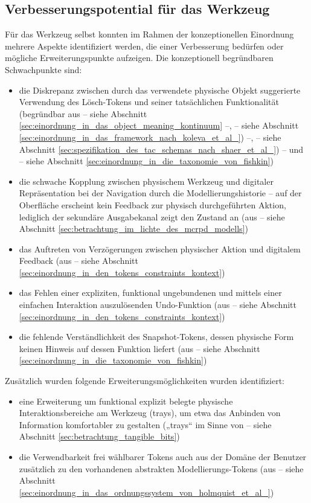 
\subsection{Verbesserungspotential für das Werkzeug} %
\label{sub:verbesserungspotential_für_das_werkzeug}

Für das Werkzeug selbst konnten im Rahmen der konzeptionellen Einordnung mehrere Aspekte identifiziert werden, die einer Verbesserung bedürfen oder mögliche Erweiterungspunkte aufzeigen. Die konzeptionell begründbaren Schwachpunkte sind:
\begin{itemize}
	\item die Diskrepanz zwischen durch das verwendete physische Objekt suggerierte Verwendung des Lösch-Tokens und seiner tatsächlichen Funktionalität (begründbar aus \citep{Underkoffler99} -- siehe Abschnitt \ref{sec:einordnung_in_das_object_meaning_kontinuum} --, \citep{Koleva03} -- siehe Abschnitt \ref{sec:einordnung_in_das_framework_nach_koleva_et_al_}) --, \citep{Shaer04} -- siehe Abschnitt \ref{sec:spezifikation_des_tac_schemas_nach_shaer_et_al_}) -- und \citep{Fishkin04} -- siehe Abschnitt \ref{sec:einordnung_in_die_taxonomie_von_fishkin})
	\item die schwache Kopplung zwischen physischem Werkzeug und digitaler Repräsentation bei der Navigation durch die Modellierungshistorie -- auf der Oberfläche erscheint kein Feedback zur physisch durchgeführten Aktion, lediglich der sekundäre Ausgabekanal zeigt den Zustand an (aus \citep{Ullmer00} -- siehe Abschnitt \ref{sec:betrachtung_im_lichte_des_mcrpd_modells})
	\item das Auftreten von Verzögerungen zwischen physischer Aktion und digitalem Feedback (aus \citep{Bellotti02} -- siehe Abschnitt \ref{sec:einordnung_in_den_tokens_constraints_kontext})
	\item das Fehlen einer expliziten, funktional ungebundenen und mittels einer einfachen Interaktion auszulösenden Undo-Funktion (aus \citep{Bellotti02} -- siehe Abschnitt \ref{sec:einordnung_in_den_tokens_constraints_kontext})
	\item die fehlende Verständlichkeit des Snapshot-Tokens, dessen physische Form keinen Hinweis auf dessen Funktion liefert (aus \citep{Fishkin04} -- siehe Abschnitt \ref{sec:einordnung_in_die_taxonomie_von_fishkin})
\end{itemize}

Zusätzlich wurden folgende Erweiterungsmöglichkeiten wurden identifiziert:
\begin{itemize}
	\item eine Erweiterung um funktional explizit belegte physische Interaktionsbereiche am Werkzeug (trays), um etwa das Anbinden von Information komfortabler zu gestalten („trays“ im Sinne von \citep{Ishii97} -- siehe Abschnitt \ref{sec:betrachtung_tangible_bits})
	\item die Verwendbarkeit frei wählbarer Tokens auch aus der Domäne der Benutzer zusätzlich zu den vorhandenen abstrakten Modellierungs-Tokens (aus \citep{Holmquist99} -- siehe Abschnitt \ref{sec:einordnung_in_das_ordnungssystem_von_holmquist_et_al_})
\end{itemize}

